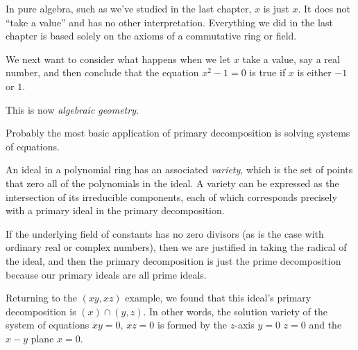 

In pure algebra, such as we've studied in the last chapter, $x$ is just $x$.  It does not
``take a value'' and has no other interpretation.  Everything we did in the last chapter
is based solely on the axioms of a commutative ring or field.

We next want to consider what happens when we let $x$ take a value, say a real number,
and then conclude that the equation $x^2-1=0$ is true if $x$ is either $-1$ or $1$.

This is now {\it algebraic geometry}.


Probably the most basic application of primary decomposition is solving systems of equations.

An ideal in a polynomial ring has an associated {\it variety}, which is the set of points that
zero all of the polynomials in the ideal.  A variety can be expressed as the intersection of
its irreducible components, each of which corresponds precisely with a primary ideal in
the primary decomposition.

If the underlying field of constants has no zero divisors (as is the case with ordinary real
or complex numbers), then we are justified in taking the radical of the ideal, and then
the primary decomposition is just the prime decomposition because our primary ideals
are all prime ideals.

Returning to the $(xy,xz)$ example, we found that this ideal's primary decomposition
is $(x) \cap (y,z)$.  In other words, the solution variety of the system
of equations $xy=0$, $xz=0$ is formed by the $z$-axis $y=0$ $z=0$ and the $x-y$ plane $x=0$.
